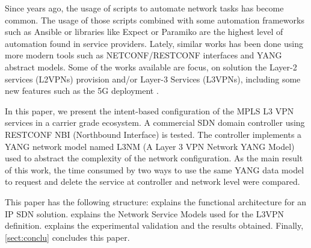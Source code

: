 \documentclass[conference]{IEEEtran}
\begin{document}
Since years ago, the usage of scripts to automate network tasks has become common. The usage of those scripts combined with some automation frameworks such as Ansible \cite{libes1995exploring} or libraries like Expect \cite{hochstein2017ansible} or Paramiko \cite{zadka2019paramiko} are the highest level of automation found in service providers. Lately, similar works has been done using more modern tools such as NETCONF/RESTCONF \cite{enns2011network,bierman2017RESTCONF,vilalta2018experimental} interfaces and YANG \cite{bjorklund2016yang} abstract models. Some of the works available are focus, on solution the  Layer-2 services (L2VPNs) provision \cite{ventre2017sdn,noghani2017automating,wuframework} and/or Layer-3 Services (L3VPNs), including some new features such as the 5G deployment \cite{rokui2020standards}.



In this paper, we present the intent-based configuration of the MPLS L3 VPN services in a carrier grade ecosystem. A commercial SDN domain controller using RESTCONF NBI (Northbound Interface) is tested. The controller implements a YANG network model named L3NM (A Layer 3 VPN Network YANG Model) used to abstract the complexity of the network configuration.  As the main result of this work, the time consumed by two ways to use the same YANG data model to request and delete the service at controller and network level were compared.

This paper has the following structure:  explains the functional architecture for an IP SDN solution.  explains the Network Service Models used for the L3VPN definition.  explains the experimental validation and the results obtained. Finally, \cref{sect:conclu} concludes this paper. 
\end{document}
